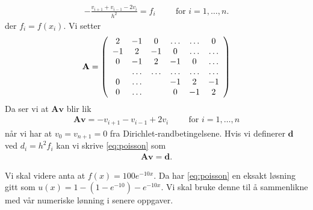 \documentclass[11pt]{article}
\numberwithin{figure}{section} %
\numberwithin{table}{section} %
\renewcommand{\vec}{\mathbf} %
\begin{document}
\begin{align}
  - \frac{ v_{i+1} + v_{i-1} - 2v_i }{ h^2 } =
  f_i\hspace{1cm}\text{for } i = 1,\dots,n.
\end{align}
der $f_i = f(x_i)$. Vi setter 
\begin{align*}
      {\bf A} = \left(\begin{array}{cccccc}
                           2& -1& 0 &\dots   & \dots &0 \\
                           -1 & 2 & -1 &0 &\dots &\dots \\
                           0&-1 &2 & -1 & 0 & \dots \\
                           & \dots   & \dots &\dots   &\dots & \dots \\
                           0&\dots   &  &-1 &2& -1 \\
                           0&\dots    &  & 0  &-1 & 2 \\
                      \end{array} \right)
\end{align*}
Da ser vi at $\vec A \vec v$ blir lik 
\begin{align*}
  \vec A \vec v = -v_{i+1} - v_{i-1} + 2v_i\hspace{1cm}\text{for } i = 1,\dots,n
\end{align*}
når vi har at $v_0 = v_{n+1} = 0$ fra Dirichlet-randbetingelsene. Hvis
vi definerer $\vec d$ ved $d_i = h^2f_i$ kan vi skrive
\eqref{eq:poisson} som 
\begin{align}
  \vec A \vec v = \vec d.
\end{align}
 

Vi skal videre anta at $f(x) = 100 e^{-10x}$. Da har
\eqref{eq:poisson} en eksakt løsning gitt som $u(x) = 1 -
\left(1-e^{-10}\right) - e^{-10x}$. Vi skal bruke denne til å
sammenlikne med vår numeriske lønning i senere oppgaver.

\subsection{}
\end{document}
